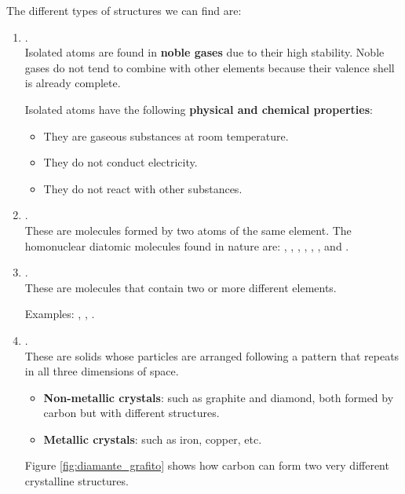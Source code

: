 The different types of structures we can find are:
\begin{enumerate}[label=\numberballmDarkTeal]
        \item {}. \\
        Isolated atoms are found in \textbf{noble gases} due to their high stability.
        Noble gases do not tend to combine with other elements because their valence shell is already complete.

        Isolated atoms have the following \textbf{physical and chemical properties}:
        \begin{itemize}
            \item They are gaseous substances at room temperature.
            \item They do not conduct electricity.
            \item They do not react with other substances.
        \end{itemize}

        \item {}. \\
        These are molecules formed by two atoms of the same element.
        The homonuclear diatomic molecules found in nature are:
        , , , , , , and .

        \item {}. \\
        These are molecules that contain two or more different elements.

        Examples: , , .

        \item {}. \\
        These are solids whose particles are arranged following a pattern that repeats in all three dimensions of space.
        \begin{itemize}
            \item \textbf{Non-metallic crystals}: such as graphite and diamond, both formed by carbon but with different structures.
            \item \textbf{Metallic crystals}: such as iron, copper, etc.
        \end{itemize}

        Figure \eqref{fig:diamante_grafito} shows how carbon can form two very different crystalline structures.


\end{enumerate}
